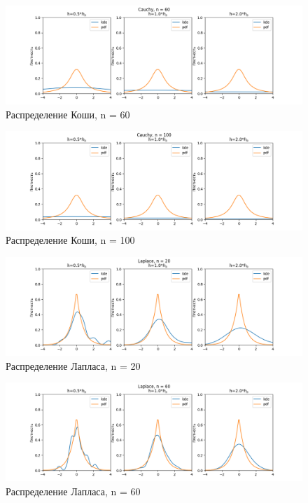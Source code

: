 \documentclass[12pt]{article}
\begin{document}
\begin{figure}
  \centering
  \includegraphics[width=0.8\paperwidth ]{../images/kde/Cauchy_60.png}
  \caption{Распределение Коши, n = 60}
\end{figure}

\begin{figure}
  \centering
  \includegraphics[width=0.8\paperwidth ]{../images/kde/Cauchy_100.png}
  \caption{Распределение Коши, n = 100}
\end{figure}

\begin{figure}
  \centering
  \includegraphics[width=0.8\paperwidth ]{../images/kde/Laplace_20.png}
  \caption{Распределение Лапласа, n = 20}
\end{figure}

\begin{figure}
  \centering
  \includegraphics[width=0.8\paperwidth ]{../images/kde/Laplace_60.png}
  \caption{Распределение Лапласа, n = 60}
\end{figure}
\end{document}
